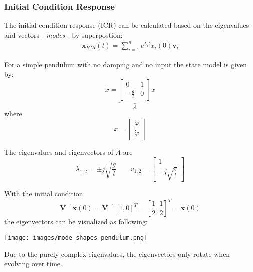 \subsubsection{Initial Condition Response}
The initial condition response (ICR) can be calculated based on the eigenvalues and vectors - \textit{modes} - by superpostion:
\noindent\begin{align*}
    \mathbf{x}_{ICR}(t) = \sum_{i=1}^{n} e^{\lambda_i t}\widetilde{x}_i(0)\mathbf{v}_i
\end{align*}

\begin{examplesection}
    For a simple pendulum with no damping and no input the state model is given by:
    \begin{equation*}
        \dot{x}=\underbrace{\begin{bmatrix}
                0            & 1  \\
                -\frac{g}{l} & 0
            \end{bmatrix}}_{A}x
    \end{equation*}
    where
    \begin{equation*}
        x=\begin{bmatrix}
            \varphi \\
            \dot{\varphi}
        \end{bmatrix}
    \end{equation*}
    
    The eigenvalues and eigenvectors of $A$ are
    \begin{equation*}
        \lambda_{1,2} = \pm j \sqrt{\frac{g}{l}} \qquad v_{1,2}=\begin{bmatrix}
            1 \\
            \pm j \sqrt{\frac{g}{l}}
        \end{bmatrix}
    \end{equation*}
    
    With the initial condition
    \noindent\begin{equation*}
        \mathbf{V}^{-1}\mathbf{x}(0) = \mathbf{V}^{-1}{[1, 0]}^T = {\left[\frac{1}{2}, \frac{1}{2}\right]}^T = \tilde{\mathbf{x}}(0)
    \end{equation*}
    the eigenvectors can be visualized as following:
    
    \texttt{[image: images/mode\_shapes\_pendulum.png]}
    
    Due to the purely complex eigenvalues, the eigenvectors only rotate when evolving over time.
    

\end{examplesection}
